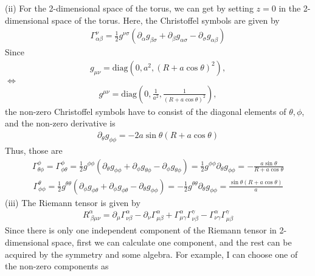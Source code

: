 \documentclass[12pt]{article}
\begin{document}
(ii) For the 2-dimensional space of the torus, we can get by setting $z=0$ in the 2-dimensional space of the torus.
Here, the Christoffel symbols are given by
\begin{align}
\Gamma^{\nu}_{\alpha \beta} = \frac{1}{2} g^{\nu \sigma} \left(\partial_{\alpha} g_{\beta \sigma} + \partial_{\beta} g_{\alpha \sigma} - \partial_{\sigma} g_{\alpha \beta}\right)
\end{align}
Since
\begin{align}
g_{\mu \nu} = \mathrm{diag}\left(0, a^2, \left( R + a \cos{\theta}\right)^2\right),
\end{align}
$\Leftrightarrow$
\begin{align}
g^{\mu \nu} = \mathrm{diag}\left(0, \frac{1}{a^2}, \frac{1}{\left( R + a \cos{\theta}\right)^{2}}\right),
\end{align}
the non-zero Christoffel symbols have to consist of the diagonal elements of $\theta, \phi$, and the non-zero derivative is
\begin{align}
\partial_{\theta} g_{\phi \phi} = - 2 a \sin{\theta} \left( R + a \cos{\theta}\right)
\end{align}
Thus, those are
\begin{align}
\Gamma^{\phi}_{\theta \phi} = \Gamma^{\phi}_{\phi \theta} = \frac{1}{2} g^{\phi \phi} \left(\partial_{\theta} g_{\phi \phi} + \partial_{\phi} g_{\theta \phi} - \partial_{\phi} g_{\theta \phi}\right) = \frac{1}{2} g^{\phi \phi} \partial_{\theta} g_{\phi \phi} = - \frac{a \sin{\theta}}{R + a \cos{\theta}}
\end{align}
\begin{align}
\Gamma^{\theta}_{\phi \phi} = \frac{1}{2} g^{\theta \theta} \left(\partial_{\phi} g_{\phi \theta} + \partial_{\phi} g_{\phi \theta} - \partial_{\theta} g_{\phi \phi}\right) = - \frac{1}{2} g^{\theta \theta} \partial_{\theta} g_{\phi \phi} = \frac{\sin{\theta} \left( R + a \cos{\theta}\right)}{a}
\end{align}
(iii)
The Riemann tensor is given by
\begin{align}
R^{\alpha}_{~\beta \mu \nu} = \partial_{\mu} \Gamma^{\alpha}_{\nu \beta} - \partial_{\nu} \Gamma^{\alpha}_{\mu \beta} + \Gamma^{\alpha}_{\mu \gamma} \Gamma^{\gamma}_{\nu \beta} - \Gamma^{\alpha}_{\nu \gamma} \Gamma^{\gamma}_{\mu \beta}
\end{align}
Since there is only one independent component of the Riemann tensor in 2-dimensional space, first we can calculate one component, and the rest can be acquired by the symmetry and some algebra. For example, I can choose one of the non-zero components as
\end{document}
